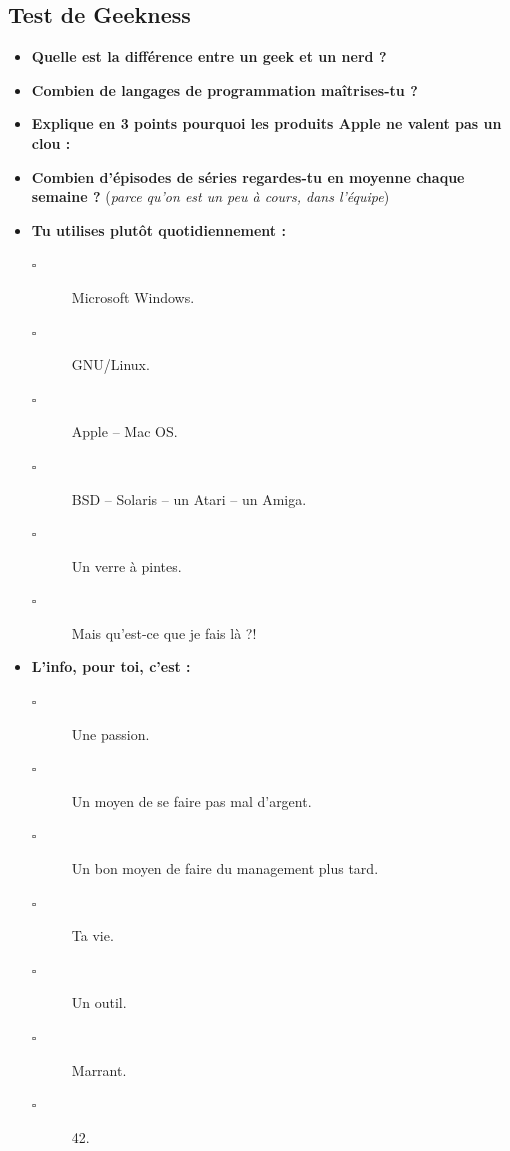 \subsection*{Test de Geekness}
\vspace{1em}
\begin{itemize}
    \item \textbf{Quelle est la différence entre un geek et un nerd ?}
    \vspace{3cm}
    \item \textbf{Combien de langages de programmation maîtrises-tu ?}
    \vspace{3cm}
    \item \textbf{Explique en 3 points pourquoi les produits Apple ne valent
	pas un clou :}
    \vspace{5cm}
    \item \textbf{Combien d'épisodes de séries regardes-tu en moyenne chaque
	semaine ?} (\emph{parce qu'on est un peu à cours, dans l'équipe})
    \vspace{4cm}
    
    \item \textbf{Tu utilises plutôt quotidiennement :}
    \begin{description}
	\item[$\square$] Microsoft Windows.
	\item[$\square$] GNU/Linux.
	\item[$\square$] Apple -- Mac OS.
	\item[$\square$] BSD -- Solaris -- un Atari -- un Amiga.
	\item[$\square$] Un verre à pintes.
	\item[$\square$] Mais qu'est-ce que je fais là ?!
    \end{description}
	\vspace{1cm}
	
    \item \textbf{L'info, pour toi, c'est :}
    \begin{description}
	\item[$\square$] Une passion.
	\item[$\square$] Un moyen de se faire pas mal d'argent.
	\item[$\square$] Un bon moyen de faire du management plus tard.
	\item[$\square$] Ta vie.
	\item[$\square$] Un outil.
	\item[$\square$] Marrant.
	\item[$\square$] 42.
    \end{description}
	\vspace{1cm}
	

\end{itemize}
